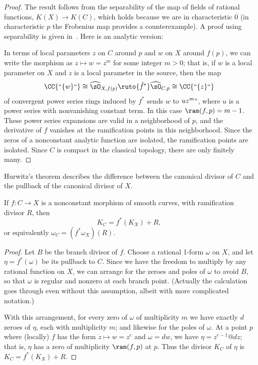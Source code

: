 \begin{proof}
The result follows from the separability of the map of fields of rational functions, $K(X) \to K(C)$, which holds because we
are in characteristic 0 (in characteristic $p$ the 
Frobenius map
%
provides a counterexample). A proof using separability
is given in~\cite[Section IV.2]{Hartshorne1977}. Here is an analytic version:

In terms of local parameters $z$ on $C$ around $p$ and $w$ on $X$ around $f(p)$, we can write the morphism as $z \mapsto w = z^m$ for some integer $m > 0$; that is,
if $w$ is a local parameter on $X$ and $z$ is a local parameter in the source, then
the map
$$
 \CC\{` `\{w\}` `\} \cong \widehat\sO_{X,f(p)} \ruto{\hat f^*}\widehat\sO_{C,p}\cong  \CC\{` `\{z\}` `\} 
$$ 
of convergent power series rings induced by $f^*$
sends $w$ to $uz^m` `$, where $u$ is a power series with nonvanishing constant term.
In this case $\ram(f,p) = m-1$. These power series expansions are valid in a neighborhood
of $p$, and the derivative of $f$ vanishes at the ramification points in this neighborhood. Since
the zeros of a nonconstant analytic function are isolated, the ramification points are isolated. 
Since $C$ is compact in the classical topology, there are only finitely many.
\end{proof}

Hurwitz's theorem describes the difference between the canonical
divisor of $C$ and the pullback of the canonical divisor of $X$.
%

\begin{theorem} 
{\rm\cite[Proposition IV.2.3]{Hartshorne1977}} \label{Hurwitz}
If $f:C\to X$ is a nonconstant morphism of smooth curves, with ramification divisor $R$, then 
$$
K_C = f^{*}(K_{X})+R,$$
or equivalently
$
\omega_{C} = (f^{*}\omega_{X})(R).
$
\end{theorem}
 
\begin{proof}
Let $B$ be the branch divisor of $f$.
Choose a rational 1-form $\omega$ on $X$, and let $\eta = f^*(\omega)$
be its pullback to $C$. 
Since we have the freedom to multiply by any rational function on $X$,
we can arrange for 
the zeroes and poles of $\omega$ to 
avoid
$B$, so that $\omega$ 
is
regular and nonzero at each branch point. (Actually the calculation
goes through even without this assumption, albeit with more
complicated notation.)  

With this arrangement,
for every zero of $\omega$ of multiplicity $m$ we have exactly $d$
zeroes of $\eta$, each with multiplicity $m$; and likewise for the
poles of $\omega$. 
 At a point $p$ where (locally) $f$ has the form $z \mapsto w = z^{e}$
and $\omega = dw$, we have $\eta = z^{e-1}@dz$; that is, $\eta$ has a zero of multiplicity $\ram(f,p)$ at  $p$.
Thus the divisor $K_{C}$ of $\eta$ is
$K_{C} = f^{*}(K_{X})+R$.
\end{proof}

